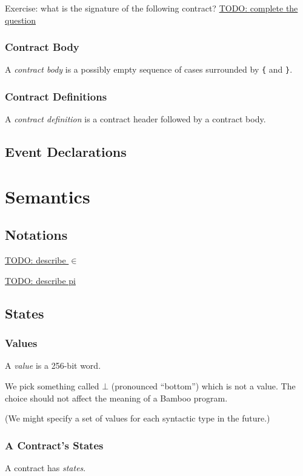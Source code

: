 \documentclass{book}
\newcommand{\todo}[1]{\underline{TODO: {#1}}}
\begin{document}
Exercise: what is the signature of the following contract?
\todo{complete the question}

\subsection{Contract Body}

A \textit{contract body} is a possibly empty sequence of cases surrounded by \texttt{\{} and \texttt{\}}.

\subsection{Contract Definitions}

A \textit{contract definition} is a contract header followed by a contract body.

\section{Event Declarations}

\chapter{Semantics}

\section{Notations}

\todo{describe $\in$}

\todo{describe pi}

\section{States}

\subsection{Values}

A \textit{value} is a 256-bit word.

We pick something called $\bot$ (pronounced ``bottom'') which is not a value.  The choice should not affect the meaning of a Bamboo program.

(We might specify a set of values for each syntactic type in the future.)

\subsection{A Contract's States}
A contract has \textit{states}.
\end{document}
